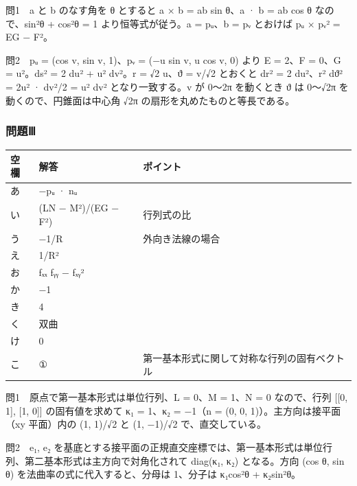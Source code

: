 \documentclass[
  10pt,
  a4paper,
]{article}
\begin{document}
問1　a と b のなす角を θ とすると \textbar a × b\textbar{} =
\textbar a\textbar\textbar b\textbar{} sin θ、a · b =
\textbar a\textbar\textbar b\textbar{} cos θ なので、sin²θ + cos²θ = 1
より恒等式が従う。a = p{\fallbackfont ᵤ}、b = p{\fallbackfont ᵥ}
とおけば \textbar p{\fallbackfont ᵤ} × p{\fallbackfont ᵥ}\textbar² = EG
− F²。

問2　p{\fallbackfont ᵤ} = (cos v, sin v, 1)、p{\fallbackfont ᵥ} = (−u
sin v, u cos v, 0) より E = 2、F = 0、G = u²。ds² = 2 du² + u² dv²。r =
√2 u、{\fallbackfont ϑ} = v/√2 とおくと dr² = 2 du²、r²
d{\fallbackfont ϑ}² = 2u² · dv²/2 = u² dv² となり一致する。v が 0〜2π
を動くとき {\fallbackfont ϑ} は 0〜√2π を動くので、円錐面は中心角 √2π
の扇形を丸めたものと等長である。

\hypertarget{ux554fux984cux2172}{%
\subsubsection{問題Ⅲ}\label{ux554fux984cux2172}}

\begin{longtable}[]{@{}lll@{}}
\toprule\noalign{}
空欄 & 解答 & ポイント \\
\midrule\noalign{}
\endhead
\bottomrule\noalign{}
\endlastfoot
あ & −p{\fallbackfont ᵤ} · n{\fallbackfont ᵤ} & \\
い & (LN − M²)/(EG − F²) & 行列式の比 \\
う & −1/R & 外向き法線の場合 \\
え & 1/R² & \\
お & f{\fallbackfont ₓₓ} f{\fallbackfont ᵧᵧ} − f{\fallbackfont ₓᵧ}² & \\
か & −1 & \\
き & 4 & \\
く & 双曲 & \\
け & 0 & \\
こ & ① & 第一基本形式に関して対称な行列の固有ベクトル \\
\end{longtable}

問1　原点で第一基本形式は単位行列、L = 0、M = 1、N = 0 なので、行列
{[}{[}0, 1{]}, {[}1, 0{]}{]} の固有値を求めて κ{\fallbackfont ₁} =
1、κ{\fallbackfont ₂} = −1（n = (0, 0, 1)）。主方向は接平面（xy
平面）内の (1, 1)/√2 と (1, −1)/√2 で、直交している。

問2　e{\fallbackfont ₁}, e{\fallbackfont ₂}
を基底とする接平面の正規直交座標では、第一基本形式は単位行列、第二基本形式は主方向で対角化されて
diag(κ{\fallbackfont ₁}, κ{\fallbackfont ₂}) となる。方向 (cos θ, sin θ)
を法曲率の式に代入すると、分母は 1、分子は κ{\fallbackfont ₁}cos²θ +
κ{\fallbackfont ₂}sin²θ。
\end{document}
